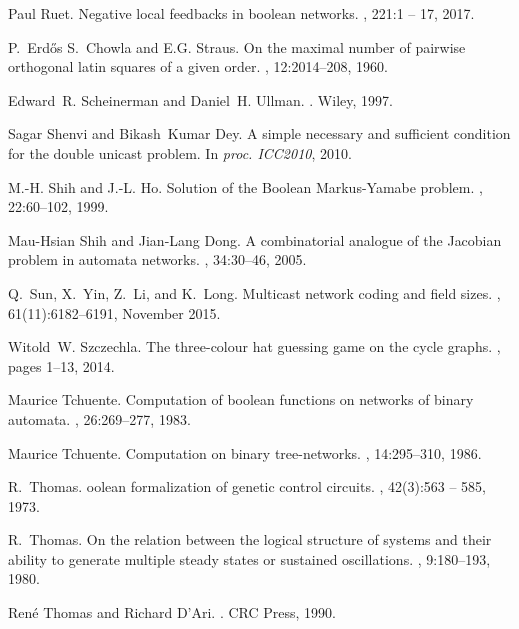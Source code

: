 \documentclass[a4paper, 11pt]{book}
\numberwithin{equation}{section}
\theoremstyle{plain}
\renewcommand{\(}{\ldbrack}
\renewcommand{\)}{\rdbrack}
\begin{document}
\begin{thebibliography}{100}
Paul Ruet.
\newblock Negative local feedbacks in boolean networks.
, 221:1 -- 17, 2017.

P.~Erd\H{o}s S.~Chowla and E.G. Straus.
\newblock On the maximal number of pairwise orthogonal latin squares of a given
  order.
, 12:2014--208, 1960.

Edward~R. Scheinerman and Daniel~H. Ullman.
.
\newblock Wiley, 1997.

Sagar Shenvi and Bikash~Kumar Dey.
\newblock A simple necessary and sufficient condition for the double unicast
  problem.
\newblock In {\em proc. ICC2010}, 2010.

M.-H. Shih and J.-L. Ho.
\newblock Solution of the {B}oolean {M}arkus-{Y}amabe problem.
, 22:60--102, 1999.

Mau-Hsian Shih and Jian-Lang Dong.
\newblock A combinatorial analogue of the {J}acobian problem in automata
  networks.
, 34:30--46, 2005.

Q.~Sun, X.~Yin, Z.~Li, and K.~Long.
\newblock Multicast network coding and field sizes.
, 61(11):6182--6191,
  November 2015.

Witold~W. Szczechla.
\newblock The three-colour hat guessing game on the cycle graphs.
, pages 1--13, 2014.

Maurice Tchuente.
\newblock Computation of boolean functions on networks of binary automata.
, 26:269--277, 1983.

Maurice Tchuente.
\newblock Computation on binary tree-networks.
, 14:295--310, 1986.

R.~Thomas.
oolean formalization of genetic control circuits.
, 42(3):563 -- 585, 1973.

R.~Thomas.
\newblock On the relation between the logical structure of systems and their
  ability to generate multiple steady states or sustained oscillations.
, 9:180--193, 1980.

Ren\'e Thomas and Richard D'Ari.
.
\newblock CRC Press, 1990.


\end{thebibliography}
\end{document}
